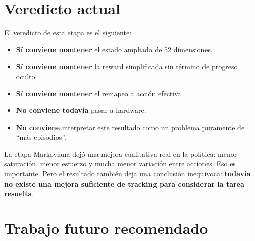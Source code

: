 \documentclass[11pt,a4paper]{article}
\begin{document}
\section{Veredicto actual}

El veredicto de esta etapa es el siguiente:
\begin{itemize}[leftmargin=1.2cm]
    \item \textbf{S\'i conviene mantener} el estado ampliado de 52 dimensiones.
    \item \textbf{S\'i conviene mantener} la reward simplificada sin t\'ermino de progreso oculto.
    \item \textbf{S\'i conviene mantener} el remapeo a acci\'on efectiva.
    \item \textbf{No conviene todav\'ia} pasar a hardware.
    \item \textbf{No conviene} interpretar este resultado como un problema puramente de ``m\'as episodios''.
\end{itemize}

La etapa Markoviana dej\'o una mejora cualitativa real en la pol\'itica: menor saturaci\'on, menor esfuerzo y mucha menor variaci\'on entre acciones. Eso es importante. Pero el resultado tambi\'en deja una conclusi\'on inequ\'ivoca: \textbf{todav\'ia no existe una mejora suficiente de tracking para considerar la tarea resuelta}.

\section{Trabajo futuro recomendado}
\end{document}

